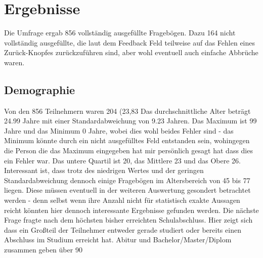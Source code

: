 %
% 

\chapter{Ergebnisse}

Die Umfrage ergab 856 vollständig ausgefüllte Fragebögen. Dazu 164 nicht vollständig ausgefüllte, die laut dem Feedback Feld teilweise auf das Fehlen eines Zurück-Knopfes zurückzuführen sind, aber wohl eventuell auch einfache Abbrüche waren.

\section{Demographie}
Von den 856 Teilnehmern waren 204 (23,83%
Das durchschnittliche Alter beträgt 24.99 Jahre mit einer Standardabweichung von 9.23 Jahren. Das Maximum ist 99 Jahre und das Minimum 0 Jahre, wobei dies wohl beides Fehler sind - das Minimum könnte durch ein nicht ausgefülltes Feld entstanden sein, wohingegen die Person die das Maximum eingegeben hat mir persönlich gesagt hat dass dies ein Fehler war. Das untere Quartil ist 20, das Mittlere 23 und das Obere 26.
Interessant ist, dass trotz des niedrigen Wertes und der geringen Standardabweichung dennoch einige Fragebögen im Altersbereich von 45 bis 77 liegen. Diese müssen eventuell in der weiteren Auswertung gesondert betrachtet werden - denn selbst wenn ihre Anzahl nicht für statistisch exakte Aussagen reicht könnten hier dennoch interessante Ergebnisse gefunden werden.
Die nächste Frage fragte nach dem höchsten bisher erreichten Schulabschluss. Hier zeigt sich dass ein Großteil der Teilnehmer entweder gerade studiert oder bereits einen Abschluss im Studium erreicht hat. Abitur und Bachelor/Master/Diplom zusammen geben über 90%

